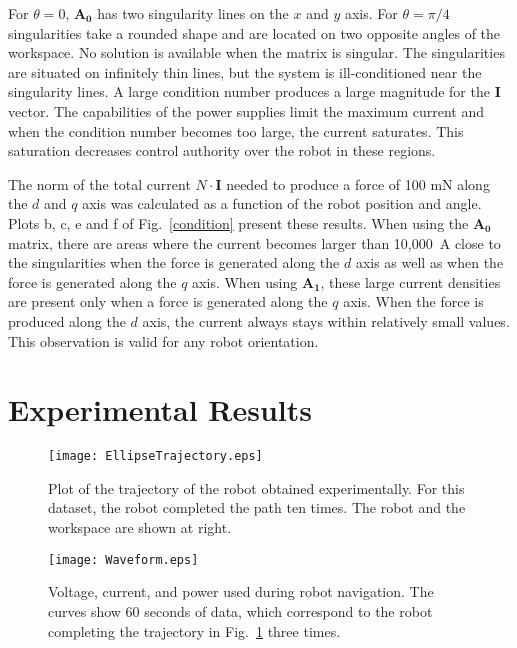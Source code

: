 For $\theta=0$, $\mathbf{A_0}$ has two singularity lines on the $x$ and $y$ axis. For $\theta=\pi/4$ singularities take a rounded shape and are located on two opposite angles of the workspace. No solution is available when the matrix is singular. The singularities are situated on infinitely thin lines, but the system is ill-conditioned near the singularity lines. A large condition number produces a large magnitude for the $\mathbf{I}$ vector. The capabilities of the power supplies limit the maximum current and when the condition number becomes too large, the current saturates. This saturation decreases control authority over the robot in these regions.\par

The norm of the total current $N \cdot \mathbf{I}$ needed to produce a force of 100 mN along the $d$ and $q$ axis was calculated as a function of the robot position and angle. Plots b, c, e and f of Fig.~\ref{condition} present these results. When using the $\mathbf{A_0}$ matrix, there are areas where the current becomes larger than 10,000~A close to the singularities when the force is generated along the $d$ axis as well as when the force is generated along the $q$ axis. When using $\mathbf{A_1}$, these large current densities are present only when a force is generated along the $q$ axis. When the force is produced along the $d$ axis, the current always stays within relatively small values. This observation is valid for any robot orientation.

\section{Experimental Results}
\label{Experiment}
\begin{figure}
\texttt{[image: EllipseTrajectory.eps]}
\vspace{-2em}
	\caption{Plot of the trajectory of the robot obtained experimentally. For this dataset, the robot completed the path ten times. The robot and the workspace are shown at right.}
	\label{Path}	
\end{figure}

\begin{figure}
	\texttt{[image: Waveform.eps]}
	\caption{Voltage, current, and power used during robot navigation. The curves show 60 seconds of data, which correspond to the robot completing the trajectory in Fig.~\ref{Path} three times.}
	\label{waveform}
\end{figure}

